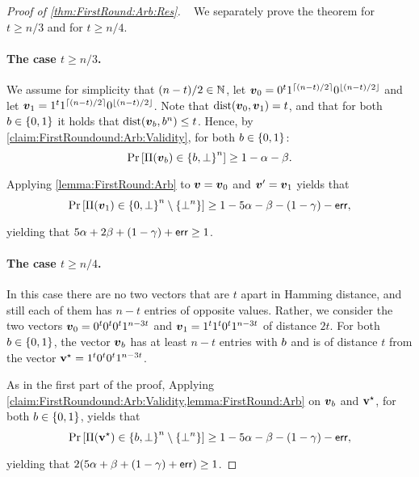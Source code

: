 \begin{proof}[Proof of \cref{thm:FirstRound:Arb:Res}]~
We separately prove the theorem for $t \ge n/3$ and for $t \ge n/4$.

\paragraph{The case $t \ge n/3$.}
We assume for simplicity that $(n-t)/2\in {\mathbb{N}}$, let ${ \boldsymbol{v}}_0= 0^t 1^{\left\lceil (n-t)/2 \right\rceil} 0^{\left \lfloor(n-t)/2 \right \rfloor} $ and let ${ \boldsymbol{v}}_1 = 1^t 1^{\left\lceil (n-t)/2 \right\rceil} 0^{\left \lfloor(n-t)/2 \right \rfloor}$. Note that $\mathrm{dist}({ \boldsymbol{v}}_0,{ \boldsymbol{v}}_1) = t$, and that for both $b\in \{0,1\}$ it holds that $\mathrm{dist}({ \boldsymbol{v}}_b,b^n)\le t$. Hence, by \cref{claim:FirstRoundound:Arb:Validity},
for both $b\in \{0,1\}$:
\begin{align*}
\Pr_{}\left[\Pi({ \boldsymbol{v}}_b) \in \left\{b,\bot\right\}^n\right] \ge 1 - \alpha - \beta.
\end{align*}
Applying \cref{lemma:FirstRound:Arb} to ${ \boldsymbol{v}}= { \boldsymbol{v}}_0$ and ${ \boldsymbol{v}}'= { \boldsymbol{v}}_1$ yields that
\begin{align*}
\Pr_{}\left[\Pi({ \boldsymbol{v}}_1) \in \left\{0,\perp\right\}^n \setminus \left\{\bot^n\right\}\right] \ge 1 - 5\alpha - \beta - (1- \gamma) - \mathsf{err},
\end{align*}
yielding that $5\alpha + 2\beta + (1-\gamma) + \mathsf{err}\ge 1$.

\paragraph{The case $t \ge n/4$.} In this case there are no two vectors that are $t$ apart in Hamming distance, and still each of them has $n-t$ entries of opposite values. Rather, we consider the two vectors ${ \boldsymbol{v}}_0= 0^t 0^t 0^t 1^{n-3t}$ and ${ \boldsymbol{v}}_1= 1^t 1^t 0^t 1^{n-3t}$ of distance $2t$. For both $b\in \{0,1\}$, the vector ${ \boldsymbol{v}}_b$ has at least $n-t$ entries with $b$ and is of distance $t$ from the vector $\mathbf{v}^{\star} =1^t 0^t 0^t 1^{n-3t}$.

As in the first part of the proof, Applying \cref{claim:FirstRoundound:Arb:Validity,lemma:FirstRound:Arb} on ${ \boldsymbol{v}}_b$ and $\mathbf{v}^{\star}$, for both $b\in \{0,1\}$, yields that
\begin{align*}
\Pr_{}\left[\Pi(\mathbf{v}^{\star}) \in \left\{b,\bot\right\}^n \setminus \left\{\bot^n\right\}\right] \ge 1 - 5\alpha - \beta - (1- \gamma) - \mathsf{err},
\end{align*}
yielding that $2(5\alpha + \beta + (1- \gamma) + \mathsf{err}) \ge 1$.
\end{proof}
	
